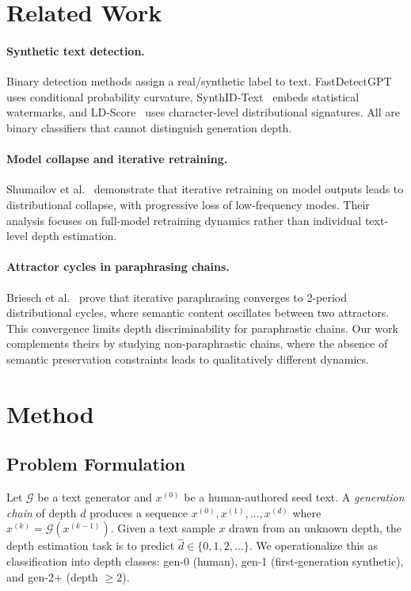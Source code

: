 \documentclass[letterpaper, 10pt]{article}
\begin{document}
\section{Related Work}

\paragraph{Synthetic text detection.}
Binary detection methods assign a real/synthetic label to text.
FastDetectGPT~\cite{bao2024fastdetectgpt} uses conditional probability curvature, SynthID-Text~\cite{dathathri2024synthid} embeds statistical watermarks, and LD-Score~\cite{dugan2024ldscore} uses character-level distributional signatures.
All are binary classifiers that cannot distinguish generation depth.

\paragraph{Model collapse and iterative retraining.}
Shumailov et al.~\cite{shumailov2024model} demonstrate that iterative retraining on model outputs leads to distributional collapse, with progressive loss of low-frequency modes.
Their analysis focuses on full-model retraining dynamics rather than individual text-level depth estimation.

\paragraph{Attractor cycles in paraphrasing chains.}
Briesch et al.~\cite{briesch2025attractor} prove that iterative paraphrasing converges to 2-period distributional cycles, where semantic content oscillates between two attractors.
This convergence limits depth discriminability for paraphrastic chains.
Our work complements theirs by studying non-paraphrastic chains, where the absence of semantic preservation constraints leads to qualitatively different dynamics.

\section{Method}

\subsection{Problem Formulation}

Let $\mathcal{G}$ be a text generator and $x^{(0)}$ be a human-authored seed text.
A \emph{generation chain} of depth $d$ produces a sequence $x^{(0)}, x^{(1)}, \ldots, x^{(d)}$ where $x^{(k)} = \mathcal{G}(x^{(k-1)})$.
Given a text sample $x$ drawn from an unknown depth, the depth estimation task is to predict $\hat{d} \in \{0, 1, 2, \ldots\}$.
We operationalize this as classification into depth classes: gen-0 (human), gen-1 (first-generation synthetic), and gen-2+ (depth $\geq 2$).
\end{document}

